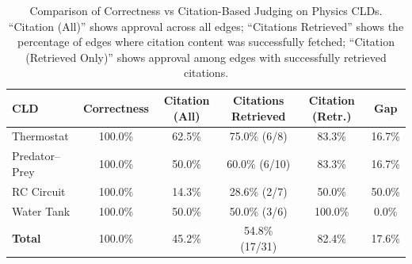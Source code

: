 \begin{table}[htbp]
\centering
\caption{Comparison of Correctness vs Citation-Based Judging on Physics CLDs. 
``Citation (All)'' shows approval across all edges; ``Citations Retrieved'' shows the percentage of edges 
where citation content was successfully fetched; ``Citation (Retrieved Only)'' shows approval among edges 
with successfully retrieved citations.}
\label{tab:physics-comparison-enhanced}
\begin{tabular}{lccccc}
\toprule
\textbf{CLD} & \textbf{Correctness} & \textbf{Citation (All)} & \textbf{Citations Retrieved} & \textbf{Citation (Retr.)} & \textbf{Gap} \\
\midrule
Thermostat & 100.0\% & 62.5\% & 75.0\% (6/8) & 83.3\% & 16.7\% \\
Predator--Prey & 100.0\% & 50.0\% & 60.0\% (6/10) & 83.3\% & 16.7\% \\
RC Circuit & 100.0\% & 14.3\% & 28.6\% (2/7) & 50.0\% & 50.0\% \\
Water Tank & 100.0\% & 50.0\% & 50.0\% (3/6) & 100.0\% & 0.0\% \\
\midrule
\textbf{Total} & 100.0\% & 45.2\% & 54.8\% (17/31) & 82.4\% & 17.6\% \\
\bottomrule
\end{tabular}
\end{table}
